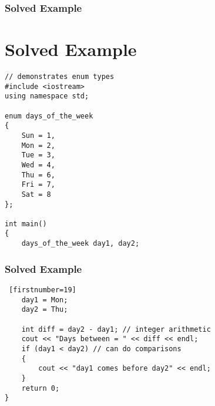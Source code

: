 \documentclass{beamer}
\begin{document}
\begin{frame} [fragile]
    \frametitle{Solved Example}
    \section{Solved Example} %
    \label{sec:solved_example}
    \lstset{style=mystyle}
\begin{lstlisting}
// demonstrates enum types
#include <iostream>
using namespace std;

enum days_of_the_week
{
    Sun = 1,
    Mon = 2,
    Tue = 3,
    Wed = 4,
    Thu = 6,
    Fri = 7,
    Sat = 8
};

int main()
{
    days_of_the_week day1, day2;
\end{lstlisting}
\end{frame}

\begin{frame} [fragile]
    \frametitle{Solved Example}
    \lstset{style=mystyle}
\begin{lstlisting} [firstnumber=19]
    day1 = Mon;
    day2 = Thu;

    int diff = day2 - day1; // integer arithmetic
    cout << "Days between = " << diff << endl;
    if (day1 < day2) // can do comparisons
    {
        cout << "day1 comes before day2" << endl;
    }
    return 0;
}
\end{lstlisting}
\end{frame}
\end{document}
